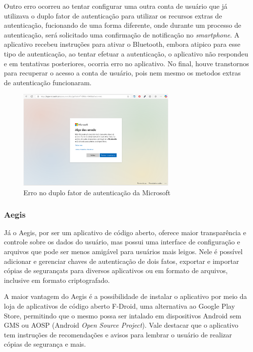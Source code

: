 \documentclass[12pt]{article}
\begin{document}
Outro erro ocorreu ao tentar configurar uma outra conta de usuário que já utilizava o
duplo fator de autenticação para utilizar os recursos extras de autenticação, fucionando
de uma forma diferente, onde durante um processo de autenticação, será solicitado uma
confirmação de notificação no \textit{smartphone}.
A aplicativo recebeu instruções para ativar o Bluetooth, embora atipico para esse tipo
de autenticação, ao tentar efetuar a autenticação, o aplicativo não respondeu e em tentativas
posteriores, ocorria erro no aplicativo.
No final, houve transtornos para recuperar o acesso a conta de usuário, pois nem mesmo os
metodos extras de autenticação funcionaram.

\begin{figure}[h!]
  \centering
  \includegraphics[width=0.7\textwidth]{./assets/microsoft_error_2.png}
  \caption{Erro no duplo fator de autenticação da Microsoft}
  \label{fig:Microsoft2FactoryAutenticatorError}
\end{figure}

\subsubsection{Aegis}

Já o Aegis, por ser um aplicativo de código aberto, oferece maior transparência
e controle sobre os dados do usuário, mas possui uma interface de configuração
e arquivos que pode ser menos amigável para usuários mais leigos.
Nele é possível adicionar e gerenciar chaves de autenticação de dois fatos,
exportar e importar cópias de segurançats para diversos aplicativos ou em formato de arquivos,
inclusive em formato criptografado.

A maior vantagem do Aegis é a possibilidade de instalar o aplicativo por meio da
loja de aplicativos de código aberto F-Droid, uma alternativa ao Google Play
Store, permitindo que o mesmo possa ser intalado em dispositivos Android sem GMS
ou AOSP (Android \textit{Open Source Project}).
Vale destacar que o aplicativo tem instruções de recomendações e avisos para lembrar o usuário
de realizar cópias de segurança e mais.
\end{document}

